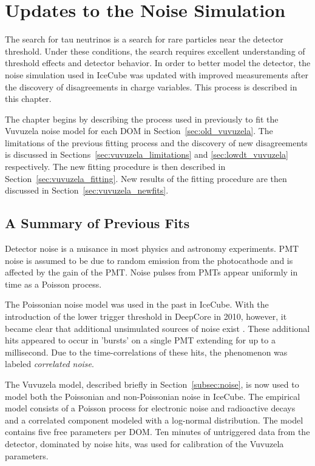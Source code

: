 \chapter{Updates to the Noise Simulation}
The search for tau neutrinos is a search for rare particles near the detector threshold.
Under these conditions, the search requires excellent understanding of threshold effects and detector behavior.
In order to better model the detector, the noise simulation used in IceCube was updated with improved measurements after the discovery of disagreements in charge variables.
This process is described in this chapter.

The chapter begins by describing the process used in previously to fit the Vuvuzela noise model for each DOM in Section~\ref{sec:old_vuvuzela}.
The limitations of the previous fitting process and the discovery of new disagreements is discussed in Sections~\ref{sec:vuvuzela_limitations} and \ref{sec:lowdt_vuvuzela} respectively.
The new fitting procedure is then described in Section~\ref{sec:vuvuzela_fitting}.
New results of the fitting procedure are then discussed in Section~\ref{sec:vuvuzela_newfits}.

\label{sec:old_vuvuzela}
\section{A Summary of Previous Fits}
Detector noise is a nuisance in most physics and astronomy experiments.
PMT noise is assumed to be due to random emission from the photocathode and is affected by the gain of the PMT.
Noise pulses from PMTs appear uniformly in time as a Poisson process.

The Poissonian noise model was used in the past in IceCube. 
With the introduction of the lower trigger threshold in DeepCore in 2010, however, it became clear that additional unsimulated sources of noise exist \cite{Thesis-Vuvuzela}.
These additional hits appeared to occur in 'bursts' on a single PMT extending for up to a millisecond.
Due to the time-correlations of these hits, the phenomenon was labeled \emph{correlated noise}.

The Vuvuzela model, described briefly in Section~\ref{subsec:noise}, is now used to model both the Poissonian and non-Poissonian noise in IceCube.
The empirical model consists of a Poisson process for electronic noise and radioactive decays and a correlated component modeled with a log-normal distribution.
The model contains five free parameters per DOM.
Ten minutes of untriggered data from the detector, dominated by noise hits, was used for calibration of the Vuvuzela parameters.

